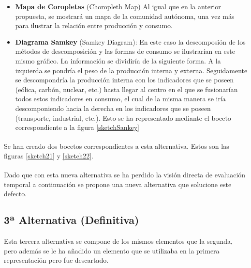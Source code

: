 \documentclass{article}
\begin{document}
				\begin{itemize}
					
					\item  {\bf Mapa de Coropletas }(Choropleth Map) Al igual que en la anterior propuesta, se mostrará un mapa de la comunidad autónoma, una vez más para ilustrar la relación entre producción y consumo.
					
					\item  {\bf Diagrama  Samkey }(Samkey Diagram): En este caso la descomposión de los métodos de descomposición y las formas de consumo se ilustrarían en este mismo gráfico. La información se dividiría de la siguiente forma. A la izquierda se pondría el peso de la producción interna y externa. Seguidamente se descompondría la producción interna con los indicadores que se poseen (eólica, carbón, nuclear, etc.) hasta llegar al centro en el que se fusionarían todos estos indicadores en consumo, el cual de la misma manera se iría descomponiendo hacia la derecha en los indicadores que se poseen (transporte, industrial, etc.). Esto se ha representado mediante el  boceto  correspondiente a la figura \ref{sketchSankey}
							
				\end{itemize}
				
				\paragraph{}
				Se han creado dos bocetos correspondientes a esta alternativa. Estos son las figuras \ref{sketch21} y \ref{sketch22}.
				
				\paragraph{}
				Dado que con esta nueva alternativa se ha perdido la visión directa de evaluación temporal a continuación se propone una nueva alternativa que solucione este defecto.

		\subsection{3ª Alternativa (Definitiva)}

			\paragraph{}
			Esta tercera alternativa se compone de los mismos elementos que la segunda, pero además se le ha añadido un elemento que se utilizaba en la primera representación pero fue descartado. 
			
\end{document}
